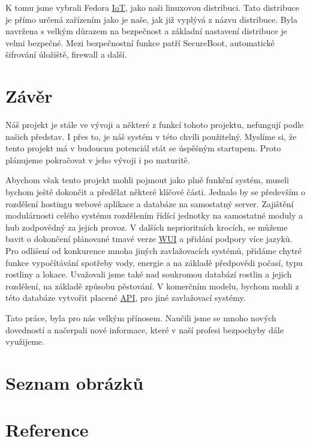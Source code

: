 \documentclass[czech,12pt,a4paper]{article}
\begin{document}
K tomu jsme vybrali Fedora \underline{\ac{IoT}}, jako naši linuxovou distribuci. Tato distribuce je přímo určená zařízením jako je naše, jak již vyplývá z názvu distribuce. Byla navržena s velkým důrazem na bezpečnost a základní nastavení distribuce je velmi bezpečné. Mezi bezpečnostní funkce patří SecureBoot, automatické šifrování úložiště, firewall a další.

\clearpage

\section{Závěr} \label{secZaver}

Náš projekt je stále ve vývoji a některé z funkcí tohoto projektu, nefungují podle našich představ. I přes to, je náš systém v této chvíli použitelný. Myslíme si, že tento projekt má v budoucnu potenciál stát se úspěšným startupem. Proto plánujeme pokračovat v jeho vývoji i po maturitě.

Abychom však tento projekt mohli pojmout jako plně funkční systém, museli bychom ještě dokončit a předělat některé klíčové části. Jednalo by se především o rozdělení hostingu webové aplikace a databáze na samostatný server. Zajištění modulárnosti celého systému rozdělením řídící jednotky na samostatné moduly a hub zodpovědný za jejich provoz. V dalších neprioritních krocích, se můžeme bavit o dokončení plánované tmavé verze \underline{\ac{WUI}} a přidání podpory více jazyků. Pro odlišení od konkurence mnoha jiných zavlažovacích systémů, přidáme chytré funkce vypočítávání spotřeby vody, energie a na základě předpovědi počasí, typu rostliny a lokace. Uvažovali jsme také nad soukromou databází rostlin a jejich rozdělení, na základě způsobu pěstování. V komerčním modelu, bychom mohli z této databáze vytvořit placené \underline{\ac{API}}, pro jiné zavlažovací systémy.

Tato práce, byla pro nás velkým přínosem. Naučili jsme se mnoho nových dovedností a načerpali nové informace, které v naší profesi bezpochyby dále využijeme.

\clearpage

\section{Seznam obrázků} \label{secObrazky}

\vspace*{-1.5cm}
\listoffigures

\clearpage

\section{Reference} \label{secReference}
\end{document}
